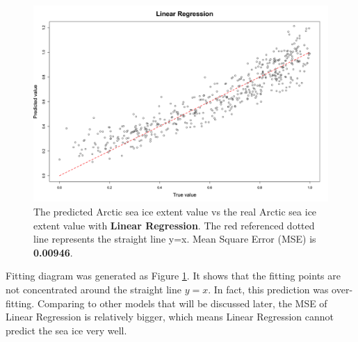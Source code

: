 \begin{figure}[htbp]
\centering
\includegraphics[width = 1.0\textwidth]{Figure/4.2.1-LR.png}
\caption{The predicted Arctic sea ice extent value vs the real Arctic sea ice extent value with \textbf{Linear Regression}. The red referenced dotted line represents the straight line y=x. Mean Square Error (MSE) is \textbf{0.00946}.}
\label{4.2.1-LR}
\end{figure}

Fitting diagram was generated as Figure \ref{4.2.1-LR}. It shows that the fitting points are not concentrated around the straight line $y=x$. In fact, this prediction was over-fitting. Comparing to other models that will be discussed later, the MSE of Linear Regression is relatively bigger, which means Linear Regression cannot predict the sea ice very well.

\newpage